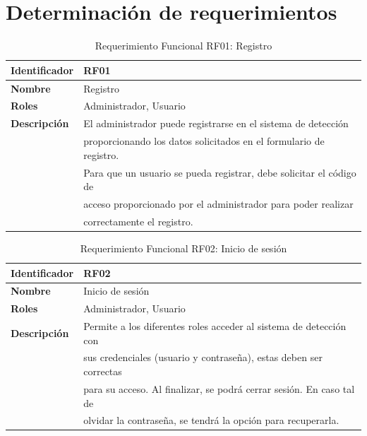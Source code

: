 \section{Determinación de requerimientos}
\begin{table}[H]
	\centering
	\caption{Requerimiento Funcional RF01: Registro}
	\label{tab:rf01}
	\begin{tabular}{@{}ll@{}} %
	  \toprule
	  \textbf{Identificador} & RF01 \\
	  \midrule
	  \textbf{Nombre} & Registro \\
	  \textbf{Roles} & Administrador, Usuario \\
	  \textbf{Descripción} & El administrador puede registrarse en el sistema de detección \\ 
						   & proporcionando los datos solicitados en el formulario de registro. \\
						   & Para que un usuario se pueda registrar, debe solicitar el código de \\
						   & acceso proporcionado por el administrador para poder realizar \\
						   & correctamente el registro. \\
	  \bottomrule
	\end{tabular}
  \end{table}
  
  \begin{table}[H]
	\centering
	\caption{Requerimiento Funcional RF02: Inicio de sesión}
	\label{tab:rf02}
	\begin{tabular}{@{}ll@{}} 
	  \toprule
	  \textbf{Identificador} & RF02 \\
	  \midrule
	  \textbf{Nombre} & Inicio de sesión \\
	  \textbf{Roles} & Administrador, Usuario \\
	  \textbf{Descripción} & Permite a los diferentes roles acceder al sistema de detección con \\
						   & sus credenciales (usuario y contraseña), estas deben ser correctas \\
						   & para su acceso. Al finalizar, se podrá cerrar sesión. En caso tal de \\
						   & olvidar la contraseña, se tendrá la opción para recuperarla. \\
	  \bottomrule
	\end{tabular}
  \end{table}
  
